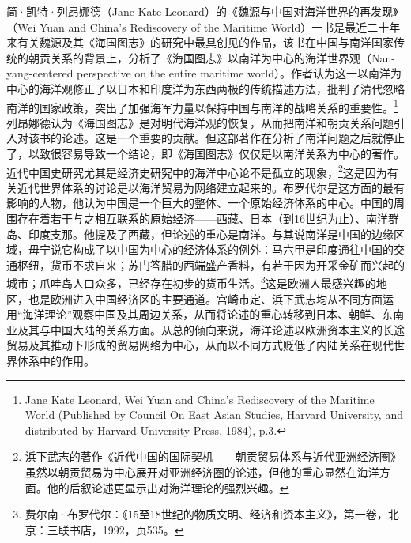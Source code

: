 \documentclass[a4paper, 12pt, openright]{ctexbook}
\begin{document}
简·凯特·列昂娜德（Jane Kate Leonard）的《魏源与中国对海洋世界的再发现》（Wei Yuan and China's Rediscovery of the Maritime World）一书是最近二十年来有关魏源及其《海国图志》的研究中最具创见的作品，该书在中国与南洋国家传统的朝贡关系的背景上，分析了《海国图志》以南洋为中心的海洋世界观（Nan-yang-centered perspective on the entire maritime world）。作者认为这一以南洋为中心的海洋观修正了以日本和印度洋为东西两极的传统描述方法，批判了清代忽略南洋的国家政策，突出了加强海军力量以保持中国与南洋的战略关系的重要性。\footnote{Jane Kate Leonard, Wei Yuan and China's Rediscovery of the Maritime World (Published by Council On East Asian Studies, Harvard University, and distributed by Harvard University Press, 1984), p.3.}列昂娜德认为《海国图志》是对明代海洋观的恢复，从而把南洋和朝贡关系问题引入对该书的论述。这是一个重要的贡献。但这部著作在分析了南洋问题之后就停止了，以致很容易导致一个结论，即《海国图志》仅仅是以南洋关系为中心的著作。近代中国史研究尤其是经济史研究中的海洋中心论不是孤立的现象，\footnote{浜下武志的著作《近代中国的国际契机——朝贡贸易体系与近代亚洲经济圈》虽然以朝贡贸易为中心展开对亚洲经济圈的论述，但他的重心显然在海洋方面。他的后叙论述更显示出对海洋理论的强烈兴趣。}这是因为有关近代世界体系的讨论是以海洋贸易为网络建立起来的。布罗代尔是这方面的最有影响的人物，他认为中国是一个巨大的整体、一个原始经济体系的中心。中国的周围存在着若干与之相互联系的原始经济——西藏、日本（到16世纪为止）、南洋群岛、印度支那。他提及了西藏，但论述的重心是南洋。与其说南洋是中国的边缘区域，毋宁说它构成了以中国为中心的经济体系的例外：马六甲是印度通往中国的交通枢纽，货币不求自来；苏门答腊的西端盛产香料，有若干因为开采金矿而兴起的城市；爪哇岛人口众多，已经存在初步的货币生活。\footnote{费尔南·布罗代尔：《15至18世纪的物质文明、经济和资本主义》，第一卷，北京：三联书店，1992，页535。}这是欧洲人最感兴趣的地区，也是欧洲进入中国经济区的主要通道。宫崎市定、浜下武志均从不同方面运用“海洋理论”观察中国及其周边关系，从而将论述的重心转移到日本、朝鲜、东南亚及其与中国大陆的关系方面。从总的倾向来说，海洋论述以欧洲资本主义的长途贸易及其推动下形成的贸易网络为中心，从而以不同方式贬低了内陆关系在现代世界体系中的作用。
\end{document}
